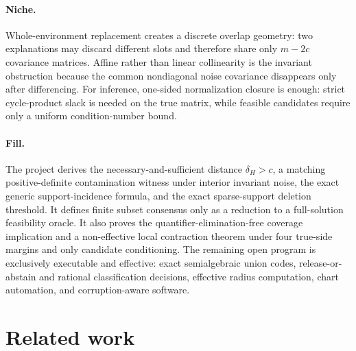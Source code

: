\documentclass{article}
\begin{document}
\paragraph{Niche.} Whole-environment replacement creates a discrete overlap geometry: two explanations may discard different slots and therefore share only \(m-2c\) covariance matrices. Affine rather than linear collinearity is the invariant obstruction because the common nondiagonal noise covariance disappears only after differencing. For inference, one-sided normalization closure is enough: strict cycle-product slack is needed on the true matrix, while feasible candidates require only a uniform condition-number bound.

\paragraph{Fill.} The project derives the necessary-and-sufficient distance \(\delta_H>c\), a matching positive-definite contamination witness under interior invariant noise, the exact generic support-incidence formula, and the exact sparse-support deletion threshold. It defines finite subset consensus only as a reduction to a full-solution feasibility oracle. It also proves the quantifier-elimination-free coverage implication and a non-effective local contraction theorem under four true-side margins and only candidate conditioning. The remaining open program is exclusively executable and effective: exact semialgebraic union codes, release-or-abstain and rational classification decisions, effective radius computation, chart automation, and corruption-aware software.

\section{Related work}
\end{document}
